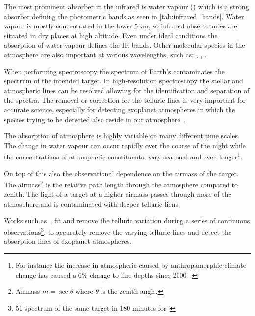 

The most prominent absorber in the infrared is water vapour () which is a strong absorber defining the photometric bands as seen in \cref{tab:infrared_bands}.
Water vapour is mostly concentrated in the lower 5\,\si{\kilo\metre}, so infrared observatories are situated in dry places at high altitude.
Even under ideal conditions the absorption of water vapour defines the IR bands.
Other molecular species in the atmosphere are also important at various wavelengths, such as: , , .

When performing spectroscopy the spectrum of Earth's contaminates the spectrum of the intended target.
In high-resolution spectroscopy the stellar and atmospheric lines can be resolved allowing for the identification and separation of the spectra.
The removal or correction for the telluric lines is very important for accurate science, especially for detecting exoplanet atmospheres in which the species trying to be detected also reside in our atmosphere~\citep{snellen_orbital_2010, brogi_carbon_2014, dekok_detection_2013}.

The absorption of atmosphere is highly variable on many different time scales.
The change in water vapour can occur rapidly over the course of the night while the concentrations of atmospheric constituents, vary seasonal and even longer\footnote{For instance the increase in atmospheric  caused by anthropamorphic climate change has caused a 6\% change to  line depths since 2000~\citep{smette_molecfit_2015}.}.

On top of this also the observational dependence on the airmass of the target.
The airmass\footnote{Airmass $m=\sec{\theta}$ where $\theta$ is the zenith angle.} is the relative path length through the atmosphere compared to zenith.
The light of a target at a higher airmass passes through more of the atmosphere and is contaminated with deeper telluric liens.

Works such as~\citet{snellen_orbital_2010}, fit and remove the telluric variation during a series of continuous observations\footnote{51 spectrum of the same target in 180 minutes for~\citet{snellen_orbital_2010}}, to accurately remove the varying telluric lines and detect the absorption lines of exoplanet atmospheres.
